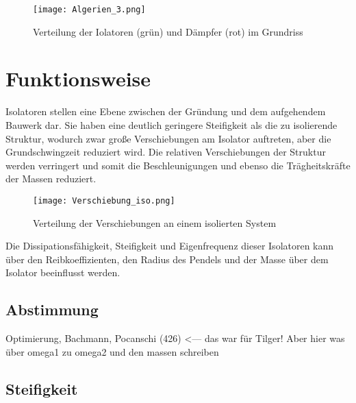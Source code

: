 \begin{figure}
    \centering
    \texttt{[image: Algerien\_3.png]}
    \caption{Verteilung der Iolatoren (grün) und Dämpfer (rot) im Grundriss \cite{AKK}}
\end{figure}

\pagebreak

\section{Funktionsweise}
\label{sec:funktion}

Isolatoren stellen eine Ebene zwischen der Gründung und dem aufgehendem Bauwerk dar. Sie haben eine deutlich geringere Steifigkeit als die zu isolierende Struktur, wodurch zwar große Verschiebungen am Isolator auftreten, aber die Grundschwingzeit reduziert wird.
Die relativen Verschiebungen der Struktur werden verringert und somit die Beschleunigungen und ebenso die Trägheitskräfte der Massen reduziert.

\begin{figure}[h]
    \centering
    \texttt{[image: Verschiebung\_iso.png]}
    \caption{Verteilung der Verschiebungen an einem isolierten System \cite{Kelly}}
\end{figure}

Die Dissipationsfähigkeit, Steifigkeit und Eigenfrequenz dieser Isolatoren kann über den Reibkoeffizienten, den Radius des Pendels und der Masse über dem Isolator beeinflusst werden.

\subsection{Abstimmung}
\label{sec:abstimmung}








Optimierung, Bachmann, Pocanschi (426)  <--- das war für Tilger! Aber hier was über omega1 zu omega2 und den massen schreiben















\subsection{Steifigkeit}
\label{sec:steifigkeit}

